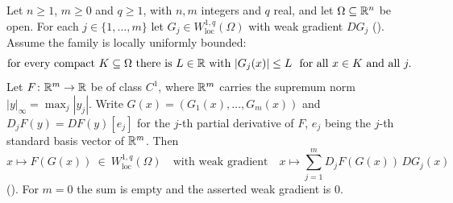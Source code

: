 \begin{lemma}
Let $n\ge1$, $m\ge0$ and $q\ge1$, with $n,m$ integers and $q$ real, and let
$\Omega\subseteq\mathbb{R}^n$ be open.  For each $j\in\{1,\dots,m\}$ let
$G_j\in W^{1,q}_{\mathrm{loc}}(\Omega)$ with weak gradient $DG_j$
().  Assume the family is locally uniformly bounded:
\[
\text{for every compact }K\subseteq\Omega\text{ there is }L\in\mathbb{R}\text{ with }
|G_j(x)|\le L\ \text{ for all }x\in K\text{ and all }j .
\]
Let $F\colon\mathbb{R}^m\to\mathbb{R}$ be of class $C^1$, where $\mathbb{R}^m$ carries the supremum
norm $|y|_\infty=\max_j|y_j|$.  Write $G(x)=(G_1(x),\dots,G_m(x))$ and
$D_jF(y)=DF(y)[e_j]$ for the $j$-th partial derivative of $F$, $e_j$ being the
$j$-th standard basis vector of $\mathbb{R}^m$.  Then
\[
x\longmapsto F(G(x))\ \in\ W^{1,q}_{\mathrm{loc}}(\Omega)
\quad\text{with weak gradient}\quad
x\longmapsto\sum_{j=1}^m D_jF(G(x))\,DG_j(x)
\]
().  For $m=0$ the sum is empty and the asserted weak
gradient is $0$.
\end{lemma}
